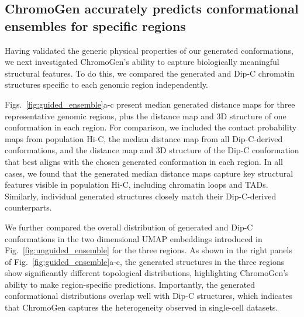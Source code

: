 \documentclass[12pt,letterpaper]{article}
\begin{document}
\subsection*{ChromoGen accurately predicts conformational ensembles for specific regions}
\label{sec:results:guided_ensemble}

Having validated the generic physical properties of our generated conformations, we next investigated ChromoGen's ability to capture biologically meaningful structural features. 
To do this, we compared the generated and Dip-C chromatin structures specific to each genomic region independently.

Figs.~\ref{fig:guided_ensemble}a-c present median generated distance maps for three representative genomic regions, plus the distance map and 3D structure of one conformation in each region. For comparison, we included the contact probability maps from population Hi-C, the median distance map from all Dip-C-derived conformations, and the distance map and 3D structure of the Dip-C conformation that best aligns with the chosen generated conformation in each region. In all cases, we found that the generated median distance maps capture key structural features visible in population Hi-C, including chromatin loops \cite{Rao2014} and TADs. Similarly, individual generated structures closely match their Dip-C-derived counterparts.


We further compared the overall distribution of generated and Dip-C conformations in the two dimensional UMAP embeddings introduced in Fig.~\ref{fig:unguided_ensemble} for the three regions. As shown in the right panels of Fig.~\ref{fig:guided_ensemble}a-c, the generated structures in the three regions show significantly different topological distributions, highlighting ChromoGen's ability to make region-specific predictions. Importantly, the generated conformational distributions overlap well with Dip-C structures, which indicates that ChromoGen captures the heterogeneity observed in single-cell datasets. 
\end{document}

